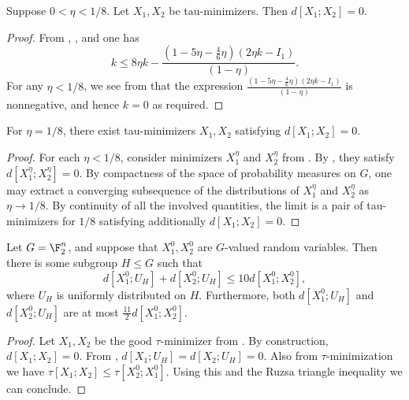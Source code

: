 \begin{theorem}\label{de-prop-improv}\leanok
Suppose $0 < \eta < 1/8$.  Let $X_1, X_2$ be tau-minimizers.  Then $d[X_1;X_2] = 0$.
\end{theorem}

\begin{proof}\leanok
From , , and  one has
  \[ k \leq 8\eta k - \frac{(1 -5 \eta - \frac{4}{6} \eta)(2 \eta k - I_1)}{(1-\eta)}.\]
  For any $\eta < 1/8$, we see from  that the expression $\frac{(1 -5 \eta - \frac{4}{6} \eta)(2 \eta k - I_1)}{(1-\eta)}$ is nonnegative, and hence $k = 0$ as required.
\end{proof}


\begin{theorem}\label{de-prop-lim-improv}\leanok
For $\eta = 1/8$, there exist tau-minimizers $X_1, X_2$ satisfying $d[X_1;X_2] = 0$.
\end{theorem}
\begin{proof}\leanok
For each $\eta<1/8$, consider minimizers $X_1^\eta$ and $X_2^\eta$ from .
By ,
they satisfy $d[X_1^\eta; X_2^\eta]=0$. By compactness of the space of probability measures
on $G$, one may extract a converging subsequence of the distributions of $X_1^\eta$ and $X_2^\eta$
as $\eta \to 1/8$. By continuity of all the involved quantities, the limit is a pair of
tau-minimizers for $1/8$ satisfying additionally $d[X_1;X_2] = 0$.
\end{proof}

\begin{theorem}\label{entropy-pfr-improv}\leanok
  Let $G = \F_2^n$, and suppose that $X^0_1, X^0_2$ are $G$-valued random variables.
  Then there is some subgroup $H \leq G$ such that
  \[
    d[X^0_1;U_H] + d[X^0_2;U_H] \le 10 d[X^0_1;X^0_2],
  \]
  where $U_H$ is uniformly distributed on $H$.
  Furthermore, both $d[X^0_1;U_H]$ and $d[X^0_2;U_H]$ are at most $\tfrac{11}{2} d[X^0_1;X^0_2]$.
\end{theorem}

\begin{proof} \leanok
Let $X_1, X_2$ be the good $\tau$-minimizer from . By construction, $d[X_1;X_2]=0$.
From , $d[X_1;U_H] = d[X_2; U_H] = 0$.  Also from $\tau$-minimization we have $\tau[X_1;X_2] \leq \tau[X^0_2;X^0_1]$.  Using this and the Ruzsa triangle inequality we can conclude.
\end{proof}

